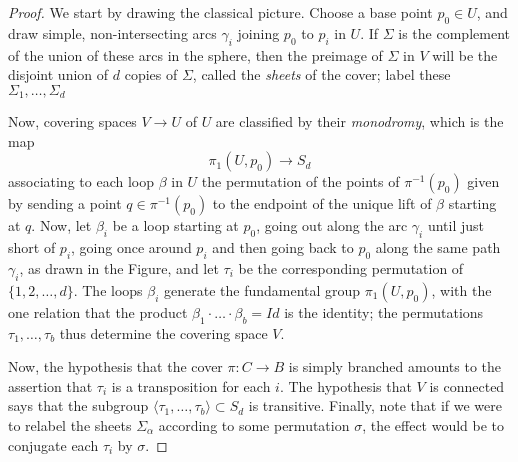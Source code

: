 \begin{proof}
  We start by drawing the classical picture. Choose a base point $p_0 \in U$, and draw simple, non-intersecting arcs $\gamma_i$ joining $p_0$ to $p_i$ in $U$. If $\Sigma$ is the complement of the union of these arcs in the sphere, then the preimage of $\Sigma$ in $V$ will be the disjoint union of $d$ copies of $\Sigma$, called the \emph{sheets} of the cover; label these $\Sigma_1,\dots,\Sigma_d$
   
  
   
   Now, covering spaces $V \to U$ of $U$ are classified by their \emph{monodromy}, which is the map
   $$
   \pi_1(U, p_0) \to S_d
   $$
   associating to each loop $\beta$ in $U$ the permutation of the points of $\pi^{-1}(p_0)$ given by sending a point $q \in \pi^{-1}(p_0)$ to the endpoint of the unique lift of $\beta$ starting at $q$. Now, let $\beta_i$ be a loop starting at $p_0$, going out along the arc $\gamma_i$ until just short of $p_i$, going once around $p_i$ and then going back to $p_0$ along the same path $\gamma_i$, as drawn in the Figure, and let $\tau_i$ be the corresponding permutation of $\{1,2,\dots,d\}$. The loops $\beta_i$  generate the fundamental group $\pi_1(U, p_0)$, with the one relation that the product $\beta_1\cdot \dots \cdot \beta_b = Id$ is the identity; the permutations $\tau_1,\dots,\tau_b$ thus determine the covering space $V$.
   
 
   
Now, the hypothesis that the cover $\pi : C \to B$ is simply branched amounts to the assertion that $\tau_i$ is a transposition for each $i$. The hypothesis that $V$ is connected says that the subgroup $\langle \tau_1, \dots, \tau_b \rangle \subset S_d$ is transitive. Finally, note that if we were to relabel the sheets $\Sigma_\alpha$ according to some permutation $\sigma$, the effect would be to conjugate each $\tau_i$ by $\sigma$. 


\end{proof}
